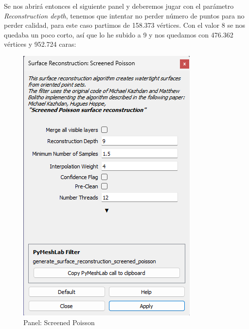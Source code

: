 \documentclass{article}
\begin{document}
\pagebreak

Se nos abrirá entonces el siguiente panel y deberemos jugar con el parámetro \textit{Reconstruction depth}, tenemos que intentar no perder número de puntos para no perder calidad, para este caso partimos de 158.373 vértices. Con el valor 8 se nos quedaba un poco corto, así que lo he subido a 9 y nos quedamos con 476.362 vértices y 952.724 caras:

\begin{figure}[H]
    \centering
    \includegraphics[scale=0.54]{images/poisson_02.png}
    \caption{Panel: Screened Poisson}
\end{figure}
\end{document}
